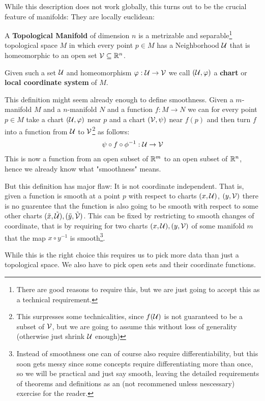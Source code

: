 While this description does not work globally, this turns out to be the crucial feature of manifolds: They are
locally euclidean:
\begin{definition}
A \textbf{Topological Manifold} of dimension $n$ is a metrizable and separable\footnote{
	There are good reasons to require this, but we are just going to accept this as a technical requirement.
}
topological space $M$ in which every point $p \in M$ has a Neighborhood $\mathcal{U}$ that is homeomorphic to
an open set $\mathcal{V} \subseteq \mathbb{R}^n$.

Given such a set $\mathcal{U}$ and homeomorphism $\varphi: \mathcal{U} \to \mathcal{V}$ we call $(\mathcal{U}, \varphi)$ a \textbf{chart}
or \textbf{local coordinate system} of $M$.
\end{definition}
This definition might seem already enough to define smoothness. Given a $m$-manifold $M$ and a
$n$-manifold $N$ and a function $f: M \to N$ we can for every point $p \in M$ take a chart
$(\mathcal{U}, \varphi)$ near $p$ and a chart $(\mathcal{V}, \psi)$ near $f(p)$ and then turn $f$ into a function from
$\mathcal{U}$ to $\mathcal{V}$\footnote{
	This surpresses some technicalities, since $f(\mathcal{U})$ is not guaranteed to be a subset of $\mathcal{V}$, but
	we are going to assume this without loss of generality (otherwise just shrink $\mathcal{U}$ enough)
} as follows:
\begin{align*}
	\psi \circ f \circ \phi^{-1}: \mathcal{U} \to \mathcal{V}
\end{align*}
This is now a function from an open subset of $\mathbb{R}^m$ to an open subset of $\mathbb{R}^n$, hence we already
know what "smoothness" means.

But this definition has major flaw: It is not coordinate independent. That is, given a function is smooth at a
point $p$ with respect to charts $(x, \mathcal{U})$, $(y, \mathcal{V})$ there is no guarentee that the function is also going to be
smooth with respect to some other charts $(\tilde{x}, \tilde{\mathcal{U}}), (\tilde{y}, \tilde{\mathcal{V}})$. This can be fixed by
restricting to smooth changes of coordinate, that is by requiring for two charts $(x, \mathcal{U}), (y, \mathcal{V})$ of some manifold
$m$ that the map $x \circ y^{-1}$ is smooth\footnote{
	Instead of smoothness one can of course also require differentiability,
	but this soon gets messy since some concepts require differentiating more
	than once, so we will be practical and just say smooth, leaving the
	detailed requirements of theorems and definitions as an (not recommened
	unless nescessary) exercise for the reader.
}.

While this is the right choice this requires us to pick more data than just a topological space. We also have to pick
open sets and their coordinate functions.

